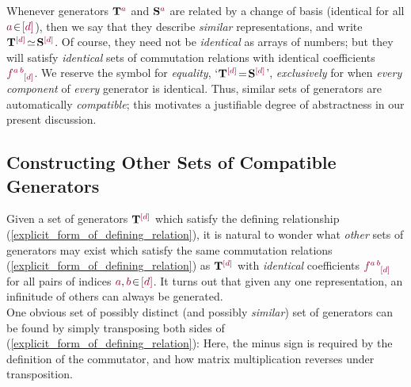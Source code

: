 \documentclass[12pt,a4paper]{article}\let\ifpdf\relax
\begin{document}
Whenever generators $\mathbf{T}\indices{\r{a}}{}$ and $\mathbf{S}\indices{\r{a}}{}$ are related by a change of basis (identical for all $\r{a}\!\in\!\r{[d]}$), then we say that they describe \emph{similar} representations, and write $\mathbf{T}\indices{\r{[d]}}{}\!\simeq\!\mathbf{S}\indices{\r{[d]}}{}$. Of course, they need not be \emph{identical} as arrays of numbers; but they will satisfy \emph{identical} sets of commutation relations with identical coefficients $\r{f}\indices{\r{a\,b}}{\r{[d]}}$. We reserve the symbol for \emph{equality}, `$\mathbf{T}\indices{\r{[d]}}{}\!=\!\mathbf{S}\indices{\r{[d]}}{}$', \emph{exclusively} for when \emph{every component} of \emph{every} generator is identical. Thus, similar sets of generators are automatically \emph{compatible}; this motivates a justifiable degree of abstractness in our present discussion.


\subsection{Constructing Other Sets of Compatible Generators}\label{building_generators_from_generators}\vspace{-4pt}

Given a set of generators $\mathbf{T}\indices{\r{[d]}}{}$ which satisfy the defining relationship (\ref{explicit_form_of_defining_relation}), it is natural to wonder what \emph{other} sets of generators may exist which satisfy the same commutation relations (\ref{explicit_form_of_defining_relation}) as $\mathbf{T}\indices{\r{[d]}}{}$ with \emph{identical} coefficients $\r{f}\indices{\r{a\,b}}{\r{[d]}}$ for all pairs of indices $\r{a},\r{b}\!\in\!\r{[d]}$. It turns out that given any one representation, an infinitude of others can always be generated.\\[-10pt]

One obvious set of possibly distinct (and possibly \emph{similar}) set of generators can be found by simply transposing both sides of (\ref{explicit_form_of_defining_relation}): 
%
%
Here, the minus sign is required by the definition of the commutator, and how matrix multiplication reverses under transposition. 
\end{document}
